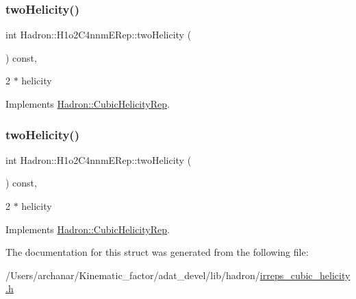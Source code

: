 \subsubsection{\texorpdfstring{twoHelicity()}{twoHelicity()}\hspace{0.1cm}{\footnotesize\ttfamily [1/2]}}
{\footnotesize\ttfamily int Hadron\+::\+H1o2\+C4nnm\+E\+Rep\+::two\+Helicity (\begin{DoxyParamCaption}{ }\end{DoxyParamCaption}) const\hspace{0.3cm}{\ttfamily [inline]}, {\ttfamily [virtual]}}

2 $\ast$ helicity 

Implements \mbox{\hyperlink{structHadron_1_1CubicHelicityRep_af507aa56fc2747eacc8cb6c96db31ecc}{Hadron\+::\+Cubic\+Helicity\+Rep}}.

\mbox{\label{structHadron_1_1H1o2C4nnmERep_ac93d65bb6c3d39b21cc3954eb7b92331}} 
\subsubsection{\texorpdfstring{twoHelicity()}{twoHelicity()}\hspace{0.1cm}{\footnotesize\ttfamily [2/2]}}
{\footnotesize\ttfamily int Hadron\+::\+H1o2\+C4nnm\+E\+Rep\+::two\+Helicity (\begin{DoxyParamCaption}{ }\end{DoxyParamCaption}) const\hspace{0.3cm}{\ttfamily [inline]}, {\ttfamily [virtual]}}

2 $\ast$ helicity 

Implements \mbox{\hyperlink{structHadron_1_1CubicHelicityRep_af507aa56fc2747eacc8cb6c96db31ecc}{Hadron\+::\+Cubic\+Helicity\+Rep}}.



The documentation for this struct was generated from the following file\+:\begin{DoxyCompactItemize}
\item 
/\+Users/archanar/\+Kinematic\+\_\+factor/adat\+\_\+devel/lib/hadron/\mbox{\hyperlink{lib_2hadron_2irreps__cubic__helicity_8h}{irreps\+\_\+cubic\+\_\+helicity.\+h}}\end{DoxyCompactItemize}

